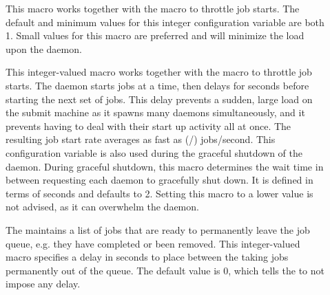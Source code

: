 \begin{description}


  
\item[] \label{param:JobStartCount} This
  macro works together with the  macro to
  throttle job starts.  The default and minimum values for this
  integer configuration variable are both 1.  Small values for this
  macro are preferred and will minimize the load upon the
   daemon.
  
\item[] \label{param:JobStartDelay}
  This integer-valued macro works together with the
   macro
  to throttle job starts.  The   daemon starts
   jobs at a time, then delays for
   seconds before starting the next set of jobs.
  This delay prevents a sudden, large load on the submit
  machine as it spawns many  daemons simultaneously,
  and it prevents having to deal
  with their start up activity all at once.
  The resulting job start rate
  averages as fast as
  (/) jobs/second.
  This configuration variable is also used during the graceful shutdown of the
   daemon.
  During graceful shutdown, this macro determines the wait time in
  between requesting each  daemon to gracefully shut down.  
  It is defined in terms of seconds and defaults to 2.  
  Setting this macro to a lower value is not advised,
  as it can overwhelm the  daemon.

\item[] \label{param:JobIsFinishedInterval}
  The  maintains a list of jobs that are ready to permanently
  leave the job queue, e.g. they have completed or been removed.  This
  integer-valued macro specifies a delay in seconds to place between the
  taking jobs permanently out of the queue.  The default value is 0, which
  tells the  to not impose any delay.  
  

\end{description}
